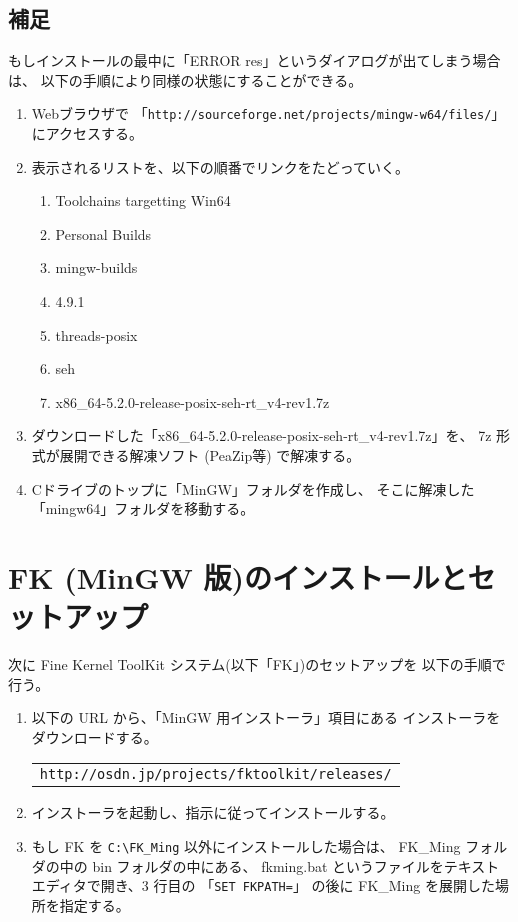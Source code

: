 \documentclass[a4paper]{jsarticle}
\begin{document}
\subsection*{補足}
もしインストールの最中に「ERROR res」というダイアログが出てしまう場合は、
以下の手順により同様の状態にすることができる。
\begin{enumerate}
 \item Webブラウザで
	「\verb+http://sourceforge.net/projects/mingw-w64/files/+」にアクセスする。

 \item 表示されるリストを、以下の順番でリンクをたどっていく。
 \begin{enumerate}
	\item Toolchains targetting Win64
	\item Personal Builds
	\item mingw-builds
	\item 4.9.1
	\item threads-posix
	\item seh
	\item x86\_64-5.2.0-release-posix-seh-rt\_v4-rev1.7z
 \end{enumerate}

 \item ダウンロードした「x86\_64-5.2.0-release-posix-seh-rt\_v4-rev1.7z」を、
	7z 形式が展開できる解凍ソフト (PeaZip等) で解凍する。

 \item Cドライブのトップに「MinGW」フォルダを作成し、
	そこに解凍した「mingw64」フォルダを移動する。
\end{enumerate}

\section{FK (MinGW 版)のインストールとセットアップ}
次に Fine Kernel ToolKit システム(以下「FK」)のセットアップを
以下の手順で行う。

\begin{enumerate}
\item 以下の URL から、「MinGW 用インストーラ」項目にある
	インストーラをダウンロードする。
	\begin{center}
	\begin{tabular}{c}
	\verb+http://osdn.jp/projects/fktoolkit/releases/+
	\end{tabular}
	\end{center}

\item インストーラを起動し、指示に従ってインストールする。
	
\item もし FK を \verb+C:\FK_Ming+ 以外にインストールした場合は、
	FK\_Ming フォルダの中の bin フォルダの中にある、
	fkming.bat というファイルをテキストエディタで開き、3 行目の
	「\verb+SET FKPATH=+」
	の後に FK\_Ming を展開した場所を指定する。
\end{enumerate}
\end{document}
